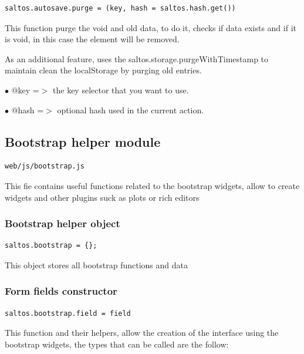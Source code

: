 \documentclass[a4paper]{article}
\begin{document}
\begin{lstlisting}
saltos.autosave.purge = (key, hash = saltos.hash.get())
\end{lstlisting}

This function purge the void and old data, to do it, checks if data exists
and if it is void, in this case the element will be removed.

As an additional feature, uses the saltos.storage.purgeWithTimestamp to maintain
clean the localStorage by purging old entries.

\begin{compactitem}
\item[\color{myblue}$\bullet$] @key  =$>$ the key selector that you want to use.
\item[\color{myblue}$\bullet$] @hash =$>$ optional hash used in the current action.
\end{compactitem}

\hypertarget{toc41}{}
\subsection{Bootstrap helper module}

\begin{lstlisting}
web/js/bootstrap.js
\end{lstlisting}

This fie contains useful functions related to the bootstrap widgets, allow to create widgets and
other plugins suck as plots or rich editors

\hypertarget{toc42}{}
\subsubsection{Bootstrap helper object}

\begin{lstlisting}
saltos.bootstrap = {};
\end{lstlisting}

This object stores all bootstrap functions and data

\hypertarget{toc43}{}
\subsubsection{Form fields constructor}

\begin{lstlisting}
saltos.bootstrap.field = field
\end{lstlisting}

This function and their helpers, allow the creation of the interface using the bootstrap
widgets, the types that can be called are the follow:
\end{document}
